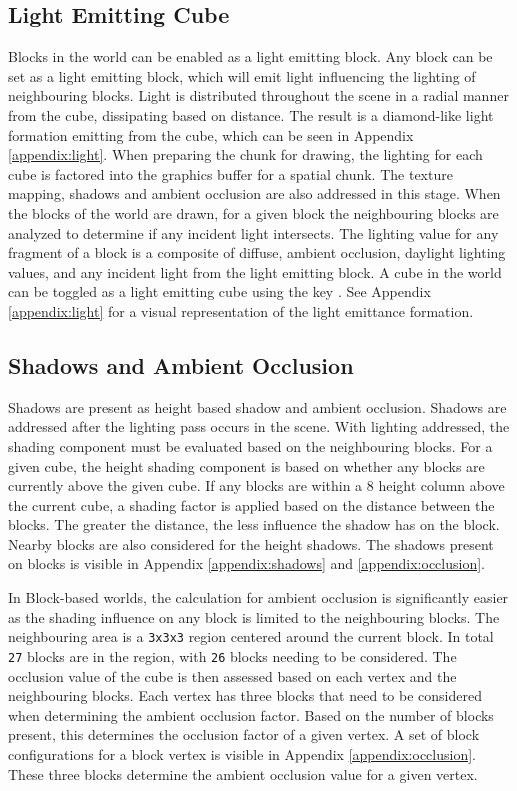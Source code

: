 \documentclass[a4paper,11pt,titlepage]{scrartcl}
\begin{document}
\subsection{Light Emitting Cube}
\label{section:lights}
Blocks in the world can be enabled as a light emitting block. Any block can be set as a light emitting block, which will emit light influencing the lighting of neighbouring blocks. Light is distributed throughout the scene in a radial manner from the cube, dissipating based on distance. The result is a diamond-like light formation emitting from the cube, which can be seen in Appendix \ref{appendix:light}. When preparing the chunk for drawing, the lighting for each cube is factored into the graphics buffer for a spatial chunk. The texture mapping, shadows and ambient occlusion are also addressed in this stage. When the blocks of the world are drawn, for a given block the neighbouring blocks are analyzed to determine if any incident light intersects. The lighting value for any fragment of a block is a composite of diffuse, ambient occlusion, daylight lighting values, and any incident light from the light emitting block. 
\vskip 2.5mm\noindent
A cube in the world can be toggled as a light emitting cube using the key . See Appendix \ref{appendix:light} for a visual representation of the light emittance formation.
    
\subsection{Shadows and Ambient Occlusion}
\label{section:shadows}
Shadows are present as height based shadow and ambient occlusion. Shadows are addressed after the lighting pass occurs in the scene. With lighting addressed, the shading component must be evaluated based on the neighbouring blocks. For a given cube, the height shading component is based on whether any blocks are currently above the given cube. If any blocks are within a $8$ height column above the current cube, a shading factor is applied based on the distance between the blocks. The greater the distance, the less influence the shadow has on the block. Nearby blocks are also considered for the height shadows. The shadows present on blocks is visible in Appendix \ref{appendix:shadows} and \ref{appendix:occlusion}.

In Block-based worlds, the calculation for ambient occlusion is significantly easier as the shading influence on any block is limited to the neighbouring blocks. The neighbouring area is a \texttt{3x3x3} region centered around the current block. In total \texttt{27} blocks are in the region, with \texttt{26} blocks needing to be considered. The occlusion value of the cube is then assessed based on each vertex and the neighbouring blocks. Each vertex has three blocks that need to be considered when determining the ambient occlusion factor. Based on the number of blocks present, this determines the occlusion factor of a given vertex. A set of block configurations for a block vertex is visible in Appendix \ref{appendix:occlusion}. These three blocks determine the ambient occlusion value for a given vertex.
\end{document}
